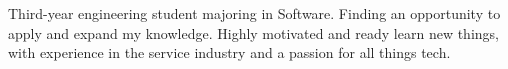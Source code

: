 \documentclass[9pt]{developercv} %
\begin{document}
\vspace{0.5cm}



\begin{minipage}[t]{0.4\textwidth} %
	\vspace{-\baselineskip} %

	Third-year engineering student majoring in Software. Finding an opportunity to apply and expand my knowledge. Highly motivated and ready learn new things, with experience in the service industry and a passion for all things tech. %
\end{minipage}
\hfill %
\begin{minipage}[t]{0.5\textwidth} %
	\vspace{-\baselineskip} %
	\begin{barchart}{5.5}
	\end{barchart}
\end{minipage}

\begin{center}
\end{center}


\end{document}
